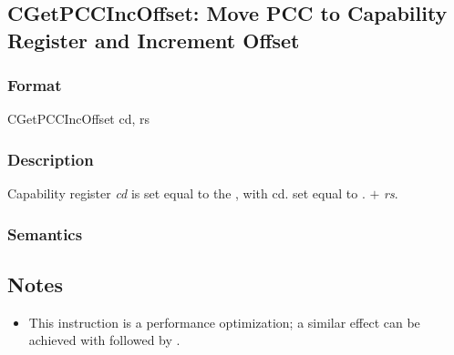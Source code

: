 \clearpage
{}
{}
\subsection*{CGetPCCIncOffset: Move PCC to Capability Register and Increment Offset}

\subsubsection*{Format}

CGetPCCIncOffset cd, rs

\begin{center}
\end{center}

\subsubsection*{Description}

Capability register \emph{cd} is set equal to the \PCC{}, with
cd.\caddr{} set equal to \PCC{}.\caddr{} $+$
\emph{rs}.

\subsubsection*{Semantics}


\subsection*{Notes}

\begin{itemize}
\item
This instruction is a performance optimization; a similar effect can be
achieved with  followed by .
\end{itemize}

